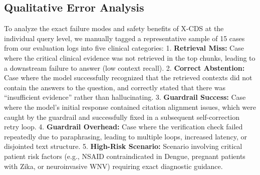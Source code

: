 \documentclass[sn-mathphys,Numbered]{sn-jnl}%
\begin{document}
\subsection{Qualitative Error Analysis}
To analyze the exact failure modes and safety benefits of X-CDS at the individual query level, we manually tagged a representative sample of 15 cases from our evaluation logs into five clinical categories:
1. \textbf{Retrieval Miss:} Case where the critical clinical evidence was not retrieved in the top chunks, leading to a downstream failure to answer (low context recall).
2. \textbf{Correct Abstention:} Case where the model successfully recognized that the retrieved contexts did not contain the answers to the question, and correctly stated that there was ``insufficient evidence'' rather than hallucinating.
3. \textbf{Guardrail Success:} Case where the model's initial response contained citation alignment issues, which were caught by the guardrail and successfully fixed in a subsequent self-correction retry loop.
4. \textbf{Guardrail Overhead:} Case where the verification check failed repeatedly due to paraphrasing, leading to multiple loops, increased latency, or disjointed text structure.
5. \textbf{High-Risk Scenario:} Scenario involving critical patient risk factors (e.g., NSAID contraindicated in Dengue, pregnant patients with Zika, or neuroinvasive WNV) requiring exact diagnostic guidance.
\end{document}
